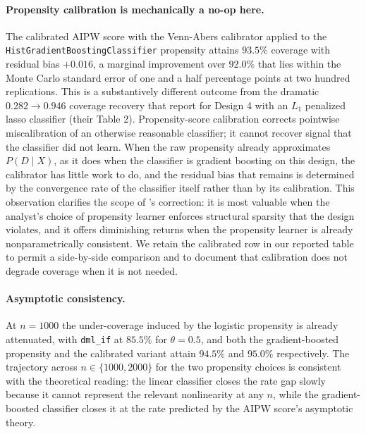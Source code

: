 \paragraph{Propensity calibration is mechanically a no-op here.} The
calibrated AIPW score with the Venn-Abers calibrator applied to the
\texttt{HistGradientBoostingClassifier} propensity attains $93.5\%$
coverage with residual bias $+0.016$, a marginal improvement over
$92.0\%$ that lies within the Monte Carlo standard error of one and a
half percentage points at two hundred replications. This is a
substantively different outcome from the dramatic
$0.282 \to 0.946$ coverage recovery that
\citet{ballinari2024improving} report for Design 4 with an $L_1$
penalized lasso classifier (their Table 2). Propensity-score
calibration corrects pointwise miscalibration of an otherwise
reasonable classifier; it cannot recover signal that the classifier
did not learn. When the raw propensity already approximates
$P(D \mid X)$, as it does when the classifier is gradient boosting on
this design, the calibrator has little work to do, and the residual
bias that remains is determined by the convergence rate of the
classifier itself rather than by its calibration. This observation
clarifies the scope of \citeauthor{ballinari2024improving}'s
correction: it is most valuable when the analyst's choice of
propensity learner enforces structural sparsity that the design
violates, and it offers diminishing returns when the propensity learner
is already nonparametrically consistent. We retain the calibrated row
in our reported table to permit a side-by-side comparison and to
document that calibration does not degrade coverage when it is not
needed.

\paragraph{Asymptotic consistency.}  At $n=1000$ the
under-coverage induced by the logistic propensity is already
attenuated, with \texttt{dml\_if} at $85.5\%$ for $\theta = 0.5$, and
both the gradient-boosted propensity and the calibrated variant attain
$94.5\%$ and $95.0\%$ respectively. The trajectory across $n \in
\{1000, 2000\}$ for the two propensity choices is consistent with the
theoretical reading: the linear classifier closes the rate gap
slowly because it cannot represent the relevant nonlinearity at any
$n$, while the gradient-boosted classifier closes it at the rate
predicted by the AIPW score's asymptotic theory.

